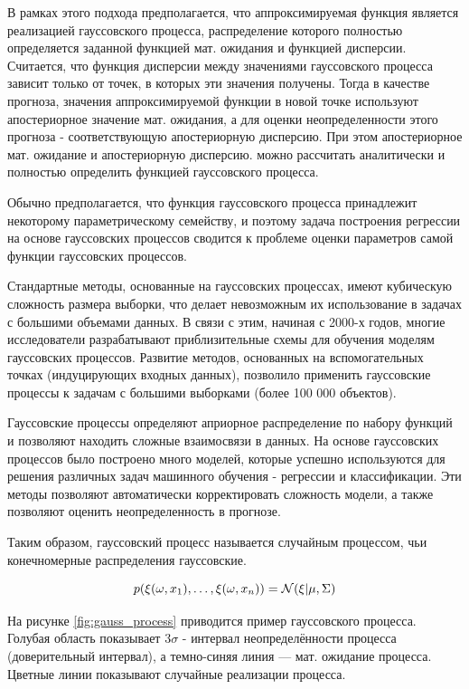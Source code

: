 В рамках этого подхода предполагается, что аппроксимируемая функция является реализацией гауссовского процесса, распределение которого полностью определяется заданной функцией мат. ожидания и функцией дисперсии. Считается, что функция дисперсии между значениями гауссовского процесса зависит только от точек, в которых эти значения получены. Тогда в качестве прогноза, значения аппроксимируемой функции в новой точке используют апостериорное значение мат. ожидания, а для оценки неопределенности этого прогноза - соответствующую апостериорную дисперсию. При этом апостериорное мат. ожидание и апостериорную дисперсию. можно рассчитать аналитически и полностью определить функцией гауссовского процесса.

Обычно предполагается, что функция гауссовского процесса принадлежит некоторому параметрическому семейству, и поэтому задача построения регрессии на основе гауссовских процессов сводится к проблеме оценки параметров самой функции гауссовских процессов.\cite{gauss_proc}

Стандартные методы, основанные на гауссовских процессах, имеют кубическую сложность размера выборки, что делает невозможным их использование в задачах с большими объемами данных. В связи с этим, начиная с 2000-х годов, многие исследователи разрабатывают приблизительные схемы для обучения моделям гауссовских процессов. Развитие методов, основанных на вспомогательных точках (индуцирующих входных данных), позволило применить гауссовские процессы к задачам с большими выборками (более 100 000 объектов).

Гауссовские процессы определяют априорное распределение по набору функций и позволяют находить сложные взаимосвязи в данных. На основе гауссовских процессов было построено много моделей, которые успешно используются для решения различных задач машинного обучения - регрессии и классификации. Эти методы позволяют автоматически корректировать сложность модели, а также позволяют оценить неопределенность в прогнозе.

Таким образом, гауссовский процесс называется случайным процессом, чьи конечномерные распределения гауссовские.

$$
 p(\xi(\omega, x_1), \dots, \xi(\omega,  x_n)) = \mathcal{N}(\xi \arrowvert \mu,  \Sigma)
$$

На рисунке \ref{fig:gauss_process} приводится пример гауссовского процесса. Голубая область показывает $3 \sigma$ - интервал неопределённости процесса (доверительный интервал), а темно-синяя линия — мат. ожидание процесса. Цветные линии показывают случайные реализации процесса.


